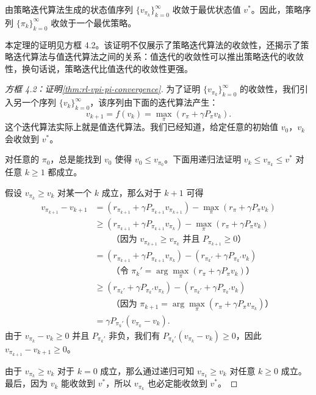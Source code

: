 \begin{theorem}[策略迭代的收敛性]\label{thm:rl-vpi-pi-convergence}
由策略迭代算法生成的状态值序列 $\{v_{\pi_k}\}_{k=0}^{\infty}$ 收敛于最优状态值 $v^{*}$。因此，策略序列 $\{\pi_k\}_{k=0}^{\infty}$ 收敛于一个最优策略。
\end{theorem}

本定理的证明见方框 4.2。该证明不仅展示了策略迭代算法的收敛性，还揭示了策略迭代算法与值迭代算法之间的关系：值迭代的收敛性可以推出策略迭代的收敛性，换句话说，策略迭代比值迭代的收敛性更强。

\begin{proof}[方框 4.2：证明\cref{thm:rl-vpi-pi-convergence}]
为了证明 $\{v_{\pi_k}\}_{k=0}^{\infty}$ 的收敛性，我们引入另一个序列 $\{v_k\}_{k=0}^{\infty}$，该序列由下面的迭代算法产生：
$$
v_{k+1} = f(v_{k}) = \max_{\pi} (r_{\pi} + \gamma P_{\pi} v_{k}).
$$
这个迭代算法实际上就是值迭代算法。我们已经知道，给定任意的初始值 $v_{0}$，$v_{k}$ 会收敛到 $v^{*}$。

对任意的 $\pi_0$，总是能找到 $v_{0}$ 使得 $v_{0} \leqslant v_{\pi_0}$。下面用递归法证明 $v_{k} \leqslant v_{\pi_{k}} \leqslant v^{*}$ 对任意 $k \geqslant 1$ 都成立。

假设 $v_{\pi_k} \geqslant v_k$ 对某一个 $k$ 成立，那么对于 $k + 1$ 可得
\begin{align*}
v_{\pi_{k+1}} - v_{k+1}
&= (r_{\pi_{k+1}} + \gamma P_{\pi_{k+1}} v_{\pi_{k+1}}) - \max_{\pi} (r_{\pi} + \gamma P_{\pi} v_{k}) \\
&\geqslant (r_{\pi_{k+1}} + \gamma P_{\pi_{k+1}} v_{\pi_{k}}) - \max_{\pi} (r_{\pi} + \gamma P_{\pi} v_{k}) \\
&\qquad \text{（因为 } v_{\pi_{k+1}} \geqslant v_{\pi_{k}} \text{ 并且 } P_{\pi_{k+1}} \geqslant 0\text{）} \\
&= (r_{\pi_{k+1}} + \gamma P_{\pi_{k+1}} v_{\pi_{k}}) - (r_{\pi_{k}'} + \gamma P_{\pi_{k}'} v_{k}) \\
&\qquad \text{（令 } \pi_{k}' = \arg\max_{\pi} (r_{\pi} + \gamma P_{\pi} v_{k})\text{）} \\
&\geqslant (r_{\pi_{k}'} + \gamma P_{\pi_{k}'} v_{\pi_{k}}) - (r_{\pi_{k}'} + \gamma P_{\pi_{k}'} v_{k}) \\
&\qquad \text{（因为 } \pi_{k+1} = \arg\max_{\pi} (r_{\pi} + \gamma P_{\pi} v_{\pi_{k}})\text{）} \\
&= \gamma P_{\pi_{k}'} (v_{\pi_{k}} - v_{k}).
\end{align*}
由于 $v_{\pi_k} - v_k \geqslant 0$ 并且 $P_{\pi_{k}'}$ 非负，我们有 $P_{\pi_{k}'}(v_{\pi_k} - v_k) \geqslant 0$，因此 $v_{\pi_{k+1}} - v_{k+1} \geqslant 0$。

由于 $v_{\pi_k} \geqslant v_k$ 对于 $k = 0$ 成立，那么通过递归可知 $v_{\pi_k} \geqslant v_k$ 对任意 $k \geqslant 0$ 成立。最后，因为 $v_k$ 能收敛到 $v^{*}$，所以 $v_{\pi_k}$ 也必定能收敛到 $v^{*}$。
\end{proof}

